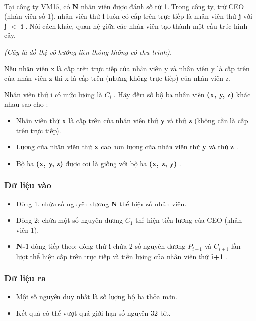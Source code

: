 

 

Tại công ty VM15, có \textbf{ N } nhân viên được đánh số từ 1. Trong công ty, trừ CEO (nhân viên số 1), nhân viên thứ \textbf{ i } luôn có cấp trên trực tiếp là nhân viên thứ \textbf{ j } với \textbf{ j }\textbf{ $<$ i } . Nói cách khác, quan hệ giữa các nhân viên tạo thành một cấu trúc hình cây.

\emph{(Cây là đồ thị vô hướng liên thông không có chu trình). }

Nếu nhân viên x là cấp trên trực tiếp của nhân viên y và nhân viên y là cấp trên của nhân viên z thì x là cấp trên (nhưng không trực tiếp) của nhân viên z.

Nhân viên thứ i có mức lương là \textbf{ $C_{i}$} . Hãy đếm số bộ ba nhân viên \textbf{ (x, y, z) } khác nhau sao cho :
\begin{itemize}
	\item Nhân viên thứ \textbf{ x } là cấp trên của nhân viên thứ \textbf{ y } và thứ \textbf{ z } (không cần là cấp trên trực tiếp).
	\item Lương của nhân viên thứ \textbf{ x } cao hơn lương của nhân viên thứ \textbf{ y } và thứ \textbf{ z } .
	\item Bộ ba \textbf{ (x, y, z) } được coi là giống với bộ ba \textbf{ (x, z, y) } .
\end{itemize}

\subsubsection{Dữ liệu vào}
\begin{itemize}
	\item Dòng 1: chứa số nguyên dương \textbf{ N } thể hiện số nhân viên.
	\item Dòng 2: chứa một số nguyên dương \textbf{ $C_{1}$} thể hiện tiền lương của CEO (nhân viên 1).
	\item \textbf{N-1 } dòng tiếp theo: dòng thứ \textbf{ i } chứa 2 số nguyên dương \textbf{ $P_{i+1}$} và \textbf{ $C_{i+1}$} lần lượt thể hiện cấp trên trực tiếp và tiền lương của nhân viên thứ \textbf{ i+1 } .
\end{itemize}

\subsubsection{Dữ liệu ra}
\begin{itemize}
	\item Một số nguyên duy nhất là số lượng bộ ba thỏa mãn.
	\item Kết quả có thể vượt quá giới hạn số nguyên 32 bit.
\end{itemize}

